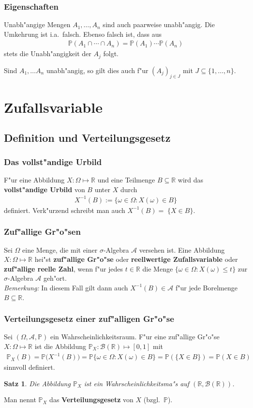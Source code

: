 \documentclass[ngerman,draft,parskip=half,twoside]{scrartcl}
\newtheorem{thm}{Satz}[section]
\newcommand*{\R}{\mathbb{R}}      %
\newcommand*{\Algeb}{\mathcal{A}}   %
\newcommand*{\BorelM}{\mathcal{B}}  %
\newcommand*{\WKM}{\mathbb{P}}      %
\begin{document}
\subsubsection{Eigenschaften}
Unabh"angige Mengen $A_1,\ldots,A_n$ sind auch paarweise unabh"angig. Die Umkehrung ist
i.a.~falsch. Ebenso falsch ist, dass aus
\begin{gather*}
  \WKM(A_{1}\cap\cdots\cap A_{n})= \WKM(A_{1})\cdots\WKM(A_{n})
\end{gather*}
stets die Unabh"angigkeit der $A_j$ folgt.

Sind $A_1,\ldots A_n$ unabh"angig, so gilt dies auch f"ur $(A_j)_{j\in J}$  mit
$J\subseteq \{1,\ldots,n\}$.

\section{Zufallsvariable}
\subsection{Definition und Verteilungsgesetz}

\subsubsection{Das vollst"andige Urbild}
F"ur eine Abbildung $X\colon\Omega\mapsto\R$ und eine Teilmenge $B\subseteq\R$ wird das
\textbf{vollst"andige Urbild} von $B$ unter $X$ durch
\begin{gather*}
  X^{-1}(B):=\{\omega\in\Omega \colon X(\omega)\in B\}
\end{gather*}
definiert. Verk"urzend schreibt man auch $X^{-1}(B)=\;\{X\in B\}$.
\subsubsection{Zuf"allige Gr"o"sen}
Sei $\Omega$ eine Menge, die mit einer $\sigma$-Algebra $\Algeb$ versehen ist. Eine Abbildung
$X\colon\Omega\mapsto\R$ hei"st \textbf{zuf"allige Gr"o"se} oder \textbf{reellwertige Zufallsvariable}
oder \textbf{zuf"allige reelle Zahl}, wenn f"ur jedes $t\in\R$ die Menge $\{\omega\in\Omega\colon X(\omega)\le t\}$
zur $\sigma$-Algebra $\Algeb$ geh"ort.\\
\textit{Bemerkung:} In diesem Fall gilt dann auch $X^{-1}(B)\in\Algeb$ f"ur jede Borelmenge $B\subseteq \R$.

\subsubsection{Verteilungsgesetz einer zuf"alligen Gr"o"se}
Sei $(\Omega,\Algeb,\WKM)$ ein Wahrscheinlichkeitsraum.
F"ur eine zuf"allige Gr"o"se $X\colon\Omega\mapsto\R$ ist die Abbildung
$\WKM_X \colon \BorelM(\R)\mapsto [0,1]$ mit
\begin{gather*}
  \WKM_X(B)=\WKM\big(X^{-1}(B)\big)=\WKM\{\omega\in\Omega \colon X(\omega)\in B\}=\WKM(\{X\in B\})= \WKM(X\in B)
\end{gather*}
sinnvoll definiert.
\begin{thm}
Die Abbildung $\WKM_X$ ist ein Wahrscheinlichkeitsma"s auf $(\R,\BorelM(\R))$.
\end{thm}
Man nennt $\WKM_X$ das \textbf{Verteilungsgesetz} von $X$ (bzgl.~$\WKM$).
\end{document}
